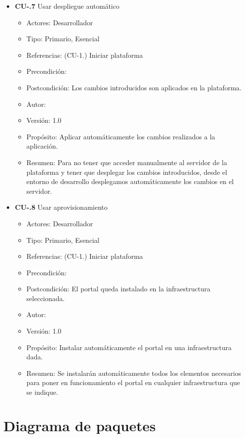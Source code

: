 \begin{itemize}
  \item \textbf{CU-.7 } Usar despliegue automático
  \begin{itemize}
    \item Actores: Desarrollador
    \item Tipo: Primario, Esencial
    \item Referencias: (CU-1.) Iniciar plataforma
    \item Precondición: 
    \item Postcondición: Los cambios introducidos son aplicados en la plataforma.
    \item Autor: \autor
    \item Versión: 1.0
    \item Propósito: Aplicar automáticamente los cambios realizados a la aplicación. 
    \item Resumen: Para no tener que acceder manualmente al servidor de la plataforma y tener que desplegar los cambios 
    introducidos, desde el entorno de desarrollo desplegamos automáticamente los cambios en el servidor.
  \end{itemize}
 
  \item \textbf{CU-.8 } Usar aprovisionamiento
  \begin{itemize}
    \item Actores: Desarrollador
    \item Tipo: Primario, Esencial
    \item Referencias: (CU-1.) Iniciar plataforma
    \item Precondición: 
    \item Postcondición: El portal queda instalado en la infraestructura seleccionada.
    \item Autor: \autor
    \item Versión: 1.0
    \item Propósito: Instalar automáticamente el portal en una infraestructura dada.
    \item Resumen: Se instalarán automáticamente todos los elementos necesarios para poner en funcionamiento el portal en 
    cualquier infraestructura que se indique.
  \end{itemize}
 \end{itemize}

\section{Diagrama de paquetes}

